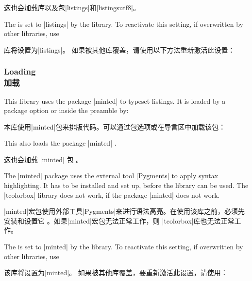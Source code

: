 这也会加载库以及包|listings|和|listingsutf8|。

The  is set to |listings| by the library.
To reactivate this setting, if overwritten by other libraries, use

库将设置为|listings|。 如果被其他库覆盖，请使用以下方法重新激活此设置：
\begin{dispListing}
\end{dispListing}


\subsubsection{Loading \\加载}
This library uses the package |minted|  to typeset
listings. It is loaded by a package option or inside the preamble by:

本库使用|minted|包来排版代码。可以通过包选项或在导言区中加载该包：
\begin{dispListing}
\end{dispListing}
This also loads the package |minted| .

这也会加载 |minted| 包 。
\begin{marker}
The |minted| package uses the external tool |Pygments| 
to apply syntax highlighting. It has to be installed and set up, before the
library can be used.%
The |tcolorbox| library  does not work, if the package
|minted|  does not work.

|minted|宏包使用外部工具|Pygments|来进行语法高亮。在使用该库之前，必须先安装和设置它%
。如果|minted|宏包无法正常工作，则 |tcolorbox|库也无法正常工作。
\end{marker}

The  is set to |minted| by the library.
To reactivate this setting, if overwritten by other libraries, use

该库将设置为|minted|。 如果被其他库覆盖，要重新激活此设置，请使用：
\begin{dispListing}
\end{dispListing}